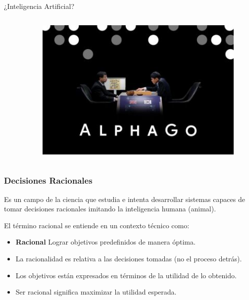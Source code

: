 \documentclass[10pt]{beamer}
\begin{document}
\begin{frame}{¿Inteligencia Artificial?}
\begin{columns}
\begin{column}{0.32\textwidth}
        \end{column}
        \begin{column}{0.32\textwidth}
            \begin{figure}[!h] 
                \centering
                \includegraphics[width=1\textwidth]{img/alphago}
            \end{figure}                
        \end{column}
    \end{columns}
    
\end{frame}

\begin{frame}
    \frametitle{Decisiones Racionales}
    Es un campo de la ciencia que estudia e intenta desarrollar sistemas 
    capaces de tomar decisiones racionales imitando la inteligencia humana (animal).

    El término \alert{racional} se entiende en un contexto técnico como:
    \begin{itemize}
        \item \textbf{Racional} Lograr objetivos predefinidos de manera óptima.
        \item La racionalidad es relativa a las decisiones tomadas (no el proceso detrás).
        \item Los objetivos están expresados en términos de la \alert{utilidad} de lo obtenido.
        \pause
        \item Ser \alert{racional} significa \alert{maximizar la utilidad esperada}.
    \end{itemize}
\end{frame}
\end{document}
